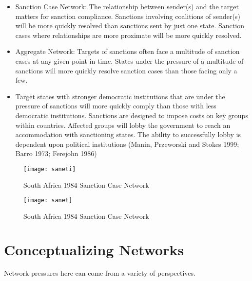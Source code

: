 \begin{itemize}
	\item Sanction Case Network: The relationship between sender(s) and the target matters for sanction compliance. Sanctions involving coalitions of sender(s) will be more quickly resolved than sanctions sent by just one state. Sanction cases where relationships are more proximate will be more quickly resolved.
	\item Aggregate Network: Targets of sanctions often face a multitude of sanction cases at any given point in time. States under the pressure of a multitude of sanctions will more quickly resolve sanction cases than those facing only a few.
	\item Target states with stronger democratic institutions that are under the pressure of sanctions will more quickly comply than those with less democratic institutions. Sanctions are designed to impose costs on key groups within countries. Affected groups will lobby the government to reach an accommodation with sanctioning states. The ability to successfully lobby is dependent upon political institutions (Manin, Przeworski and Stokes 1999; Barro 1973; Ferejohn 1986)
\end{itemize}



\begin{figure}[ht]
	\centering
	\texttt{[image: saneti]}
	\caption{South Africa 1984 Sanction Case Network}
	\label{fig:saneti}
\end{figure}
\FloatBarrier


\begin{figure}[ht]
	\centering
	\texttt{[image: sanet]}
	\caption{South Africa 1984 Sanction Case Network}
	\label{fig:sanet}
\end{figure}
\FloatBarrier

\section*{Conceptualizing Networks}

Network pressures here can come from a variety of perspectives. 


